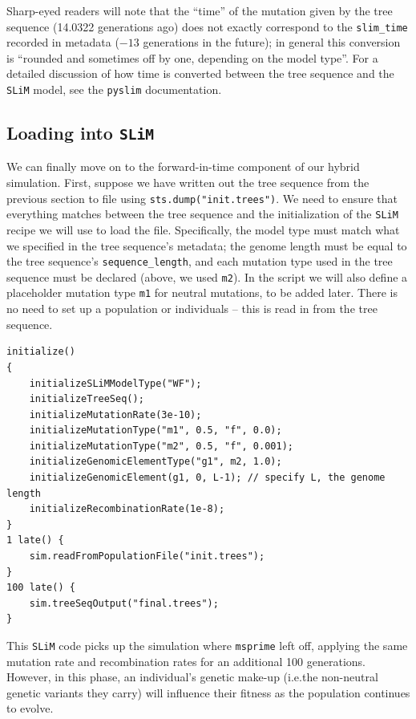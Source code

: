\documentclass[12pt]{article}
\newcommand{\msprime}[0]{\texttt{msprime}\xspace}
\newcommand{\slim}[0]{\texttt{SLiM}\xspace}
\newcommand{\pyslim}[0]{\texttt{pyslim}\xspace}
\newcommand*{\ie}{i.e.\xcomma}
\begin{document}
Sharp-eyed readers will note that the ``time'' of the mutation given by the tree sequence (14.0322 generations ago) does not exactly
correspond to the \verb|slim_time| recorded in metadata ($-13$ generations in the future); in general this conversion is ``rounded and sometimes
off by one, depending on the model type''. For a detailed discussion of how time is converted between the tree sequence and the \slim
model, see the \pyslim documentation.

\subsection{Loading into \slim}

We can finally move on to the forward-in-time component of our hybrid simulation.
First, suppose we have written out the tree sequence from the previous section to file
using \verb|sts.dump("init.trees")|.
We need to ensure that everything matches
between the tree sequence and the initialization of the \slim recipe we will use to load the file.
Specifically, the model type must match what we specified in the tree sequence's metadata;
the genome length must be equal to the tree sequence's \verb|sequence_length|,
and each mutation type used in the tree sequence must be declared (above, we used \verb|m2|).
In the script we will also define a placeholder mutation type \verb|m1| for neutral mutations, to be added later.
There is no need to set up a population or individuals -- this is read in from the tree sequence.
\begin{lstlisting}[language=slim, style=slimstyle, breaklines=true]
initialize()
{
    initializeSLiMModelType("WF");
    initializeTreeSeq();
    initializeMutationRate(3e-10);
    initializeMutationType("m1", 0.5, "f", 0.0);
    initializeMutationType("m2", 0.5, "f", 0.001);
    initializeGenomicElementType("g1", m2, 1.0);
    initializeGenomicElement(g1, 0, L-1); // specify L, the genome length
    initializeRecombinationRate(1e-8);
}
1 late() { 
    sim.readFromPopulationFile("init.trees");
}
100 late() {
    sim.treeSeqOutput("final.trees");
}
\end{lstlisting}
This \slim code picks up the simulation where \msprime left off, applying the same mutation rate and recombination rates
for an additional 100 generations.
However, in this phase, an individual's genetic make-up (\ie the non-neutral genetic variants they carry)
will influence their fitness as the population continues to evolve.
\end{document}
